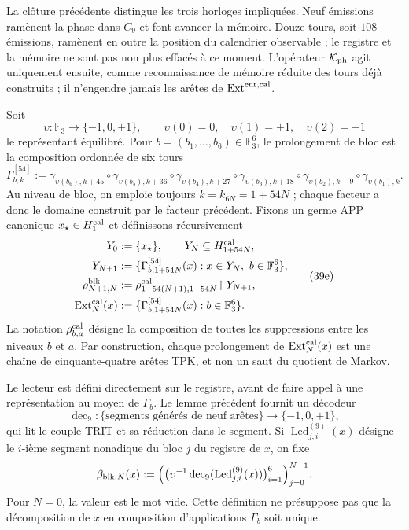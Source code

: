 La clôture précédente distingue les trois horloges impliquées. Neuf émissions
ramènent la phase dans \(C_9\) et font avancer la mémoire. Douze tours, soit
\(108\) émissions, ramènent en outre la position du calendrier observable ;
le registre et la mémoire ne sont pas non plus effacés à ce moment. L’opérateur
\(\mathcal K_{\rm ph}\) agit uniquement ensuite, comme reconnaissance de
mémoire réduite des tours déjà construits ; il n’engendre jamais les arêtes de
\(\operatorname{Ext}^{\rm enr,cal}\).



Soit
\[
 \upsilon:\mathbb F_3\longrightarrow\{-1,0,+1\},\qquad
 \upsilon(0)=0,\quad\upsilon(1)=+1,\quad\upsilon(2)=-1
\]
le représentant équilibré. Pour \(b=(b_1,\ldots,b_6)\in\mathbb F_3^6\), le prolongement de bloc est la composition ordonnée de six tours
\[
 \Gamma_{b,k}^{[54]}:=
 \gamma_{\upsilon(b_6),k+45}\circ\gamma_{\upsilon(b_5),k+36}\circ
 \gamma_{\upsilon(b_4),k+27}\circ\gamma_{\upsilon(b_3),k+18}\circ
 \gamma_{\upsilon(b_2),k+9}\circ\gamma_{\upsilon(b_1),k}.
\tag{39d}
\label{ix:eq:gamma-bloque-54-ch}
\]
Au niveau de bloc, on emploie toujours \(k=k_{6N}=1+54N\) ; chaque facteur a donc le domaine construit par le facteur précédent. Fixons un germe APP canonique \(x_\star\in H^{\rm cal}_1\) et définissons récursivement
\[
 \begin{aligned}
  Y_0&:=\{x_\star\},\qquad Y_N\subseteq H_{1+54N}^{\rm cal},\\
  Y_{N+1}&:=\{\Gamma_{b,1+54N}^{[54]}(x):
                 x\in Y_N,\ b\in\mathbb F_3^6\},\\
  \rho^{\rm blk}_{N+1,N}
    &:=\rho^{\rm cal}_{1+54(N+1),1+54N}
       \!\upharpoonright Y_{N+1},\\
  \operatorname{Ext}^{\rm cal}_N(x)
    &:=\{\Gamma_{b,1+54N}^{[54]}(x):b\in\mathbb F_3^6\}.
 \end{aligned}
\tag{39e}
\label{ix:eq:sincronizacion-54-ch}
\]
La notation \(\rho^{\rm cal}_{b,a}\) désigne la composition de toutes les suppressions
entre les niveaux \(b\) et \(a\). Par construction, chaque prolongement de
\(\operatorname{Ext}^{\rm cal}_N(x)\) est une chaîne de cinquante-quatre
arêtes TPK, et non un saut du quotient de Markov.

Le lecteur est défini directement sur le registre, avant de faire appel à une représentation au moyen de \(\Gamma_b\). Le lemme précédent fournit un décodeur
\[
 \operatorname{dec}_9:\{\text{segments générés de neuf arêtes}\}
 \longrightarrow\{-1,0,+1\},
\]
qui lit le couple TRIT et sa réduction dans le segment. Si
\(\operatorname{Led}^{(9)}_{j,i}(x)\) désigne le \(i\)-ième segment nonadique
du bloc \(j\) du registre de \(x\), on fixe
\begin{equation}
 \beta_{{\rm blk},N}(x):=
 \Bigl(
   \bigl(\upsilon^{-1}\operatorname{dec}_9
          (\operatorname{Led}^{(9)}_{j,i}(x))\bigr)_{i=1}^{6}
 \Bigr)_{j=0}^{N-1}.
 \label{ix:eq:lector-bloques-ch}
\end{equation}
Pour \(N=0\), la valeur est le mot vide. Cette définition ne présuppose pas que la décomposition de \(x\) en composition d'applications \(\Gamma_b\) soit unique.


